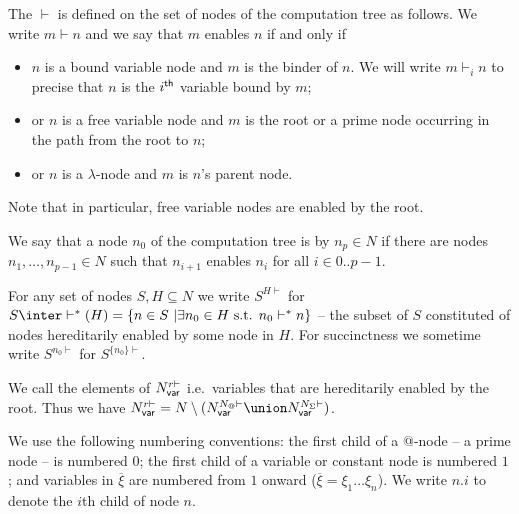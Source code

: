 \begin{definition}[Enabling]
The  $\vdash$ is defined on the set of
nodes of the computation tree as follows. We write $m \vdash n$ and
we say that $m$ enables $n$ if and only if
\begin{itemize}
\item $n$ is a bound variable node and $m$ is the binder of $n$. We will write $m \vdash_i n$ to precise that $n$
is the $i^{\sf th}$ variable bound by $m$;
\item or $n$ is a free variable node and $m$ is the root
 or a prime node occurring in the path from the root to $n$;
\item or $n$ is a $\lambda$-node and $m$ is $n$'s parent node.
\end{itemize}
Note that in particular, free variable nodes are enabled by the root.
\end{definition}

We say that a node $n_0$ of the computation tree is  by $n_p \in N$ if there are nodes $n_1,\ldots, n_{p-1} \in N$ such that $n_{i+1}$ enables $n_{i}$
for all $i\in 0..p-1$.

For any set of nodes $S, H \subseteq N$ we write $S^{H\vdash}$ for $S \inter \vdash^*(H) = \{ n \in S \ | \exists n_0 \in H \mbox{ s.t. }n_0  \vdash^* n \}$ -- the subset of $S$ constituted of nodes hereditarily enabled by some node in $H$. For succinctness we sometime write $S^{n_0\vdash}$ for
$S^{\{n_0\}\vdash}$.

We call  the elements of $N_{\sf var}^{r\vdash}$ i.e.\
variables that are hereditarily enabled by the root. Thus we have
$N_{\sf var}^{r\vdash} = N \setminus ( N_{\sf var}^{N_@\vdash}
\union N_{\sf var}^{N_\Sigma\vdash})$.
\smallskip

We use the following numbering conventions:
the first child of a @-node -- a prime node -- is numbered $0$;
the first child of a variable or constant node is numbered $1$;
and variables in $\overline{\xi}$ are numbered from $1$ onward ($\overline{\xi} = \xi_1 \ldots \xi_n$).
We write $n.i$ to denote the $i$th child of node $n$.

